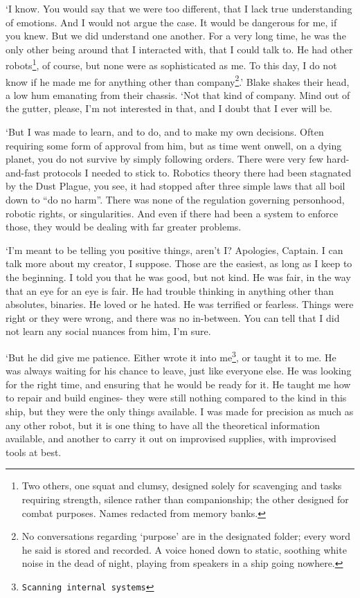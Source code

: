 `I know. You would say that we were too different, that I lack true
understanding of emotions. And I would not argue the case. It would be
dangerous for me, if you knew. But we did understand one another. For
a very long time, he was the only other being around that I interacted
with, that I could talk to. He had other robots\footnote{Two others,
one squat and clumsy, designed solely for scavenging and tasks
requiring strength, silence rather than companionship; the other
designed for combat purposes. Names redacted from memory banks.}, of
course, but none were as sophisticated as me. To this day, I do not
know if he made me for anything other than company\footnote{No
conversations regarding `purpose' are in the designated folder; every
word he said is stored and recorded. A voice honed down to static,
soothing white noise in the dead of night, playing from speakers in a
ship going nowhere.}.' Blake shakes their head, a low hum emanating
from their chassis. `Not that kind of company. Mind out of the gutter,
please, I'm not interested in that, and I doubt that I ever will be.

`But I was made to learn, and to do, and to make my own
decisions. Often requiring some form of approval from him, but as time
went on\textellipsis well, on a dying planet, you do not survive by
simply following orders. There were very few hard-and-fast protocols I
needed to stick to. Robotics theory there had been stagnated by the
Dust Plague, you see, it had stopped after three simple laws that all
boil down to ``do no harm''. There was none of the regulation
governing personhood, robotic rights, or singularities. And even if
there had been a system to enforce those, they would be dealing with
far greater problems.

`I'm meant to be telling you positive things, aren't I? Apologies,
Captain. I can talk more about my creator, I suppose. Those are the
easiest, as long as I keep to the beginning. I told you that he was
good, but not kind. He was fair, in the way that an eye for an eye is
fair. He had trouble thinking in anything other than absolutes,
binaries. He loved or he hated. He was terrified or fearless. Things
were right or they were wrong, and there was no in-between. You can
tell that I did not learn any social nuances from him, I'm sure.

`But he did give me patience. Either wrote it into
me\footnote{\texttt{Scanning internal systems\textellipsis}}, or
taught it to me. He was always waiting for his chance to leave, just
like everyone else. He was looking for the right time, and ensuring
that he would be ready for it. He taught me how to repair and build
engines- they were still nothing compared to the kind in this ship,
but they were the only things available. I was made for precision as
much as any other robot, but it is one thing to have all the
theoretical information available, and another to carry it out on
improvised supplies, with improvised tools at best.

